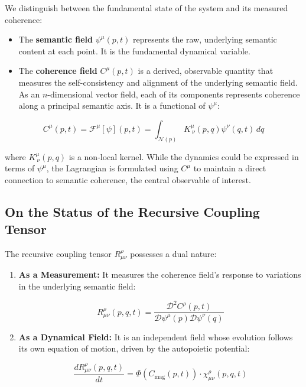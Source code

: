 We distinguish between the fundamental state of the system and its measured coherence:

\begin{itemize}

    \item The \textbf{semantic field} \(\psi^\mu(p,t)\) represents the raw, underlying semantic content at each point. It is the fundamental dynamical variable.

    \item The \textbf{coherence field} \(C^\mu(p,t)\) is a derived, observable quantity that measures the self-consistency and alignment of the underlying semantic field. As an \(n\)-dimensional vector field, each of its components represents coherence along a principal semantic axis. It is a functional of \(\psi^\mu\):

\end{itemize}

\begin{equation}
C^\mu(p,t) = \mathcal{F}^\mu[\psi](p,t) = \int_{\mathcal{N}(p)} K^\mu_{\ \nu}(p,q) \psi^\nu(q,t) \, dq
\end{equation}

where \(K^\mu_{\ \nu}(p,q)\) is a non-local kernel. While the dynamics could be expressed in terms of \(\psi^\mu\), the Lagrangian is formulated using \(C^\mu\) to maintain a direct connection to semantic coherence, the central observable of interest.


\subsection{On the Status of the Recursive Coupling Tensor}
\label{2.4.7:on_the_status_of_the_recursive_coupling_tensor}

The recursive coupling tensor \(R^\rho_{\mu\nu}\) possesses a dual nature:

\begin{enumerate}

    \item \textbf{As a Measurement:} It measures the coherence field's response to variations in the underlying semantic field:

    \begin{equation}
    \label{eq:R_measurement}
    R^\rho_{\mu\nu}(p, q, t) = \frac{\mathcal{D}^2 C^\rho(p,t)}{\mathcal{D} \psi^\mu(p) \mathcal{D} \psi^\nu(q)}
    \end{equation}

    \item \textbf{As a Dynamical Field:} It is an independent field whose evolution follows its own equation of motion, driven by the autopoietic potential:

    \begin{equation}
    \label{eq:R_dynamical}
    \frac{dR^\rho_{\mu\nu}(p,q,t)}{dt} = \Phi(C_{\mathrm{mag}}(p,t)) \cdot \chi^\rho_{\mu\nu}(p,q,t)
    \end{equation}

\end{enumerate}

